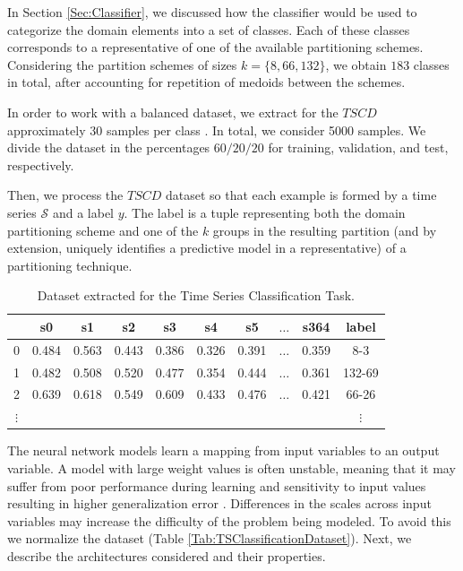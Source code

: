 
In Section \ref{Sec:Classifier}, we discussed how the classifier would be used to categorize the domain elements into a set of classes. Each of these classes corresponds to a representative of one of the available partitioning schemes. Considering the partition schemes of sizes $k=\{8, 66, 132\}$, we obtain $183$ classes in total, after accounting for repetition of medoids between the schemes.

In order to work with a balanced dataset, we extract for the $TSCD$ approximately $30$ samples per class \cite{Du2018}. In total, we consider 5000 samples. We divide the dataset in the percentages $60/20/20$ for training, validation, and test, respectively.

Then, we process the $TSCD$ dataset so that each example is formed by a time series $\mathcal{S}$ and a label $y$. The label is a tuple representing both the domain partitioning scheme and one of the $k$ groups in the resulting partition (and by extension, uniquely identifies a predictive model in a representative) of a partitioning technique.

\begin{table}[h]
	\centering
	\small
	\begin{tabular}[h]{|c|c|c|c|c|c|c|c|c|c|}
		\hline
		  & s0    & s1    & s2    & s3    & s4    &	s5    & $\ldots$ & s364  &   label \\ \hline
		0 & 0.484 & 0.563 & 0.443 & 0.386 & 0.326 &	0.391 & $\ldots$ & 0.359 &   8-3 \\
		1 &	0.482 &	0.508 &	0.520 &	0.477 &	0.354 &	0.444 & $\ldots$ & 0.361 & 132-69 \\
		2 &	0.639 & 0.618 &	0.549 &	0.609 &	0.433 & 0.476 & $\ldots$ & 0.421 &	66-26 \\ 
		$\vdots$  & &     &       &       &       &       &          &       & $\vdots$ \\ \hline
	\end{tabular}
	\caption{Dataset extracted for the Time Series Classification Task.}
	\label{Table:DatasetTSC}
\end{table}

The neural network models learn a mapping from input variables to an output variable. A model with large weight values is often unstable, meaning that it may suffer from poor performance during learning and sensitivity to input values resulting in higher generalization error \cite{Lecun1998}. Differences in the scales across input variables may increase the difficulty of the problem being modeled. To avoid this we normalize the dataset (Table \ref{Tab:TSClassificationDataset}). Next, we describe the architectures considered and their properties.

